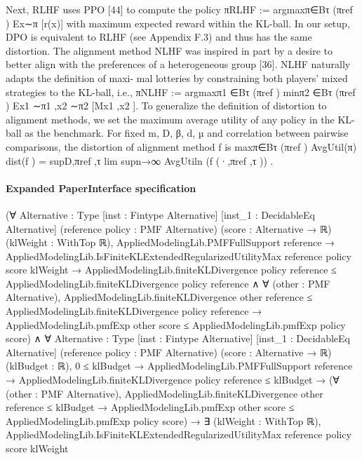 \documentclass[10pt]{article}
\begin{document}
\begin{ReviewVerbatim}
Next, RLHF uses PPO [44] to compute the policy πRLHF := argmaxπ∈Bτ (πref ) Ex∼π [r(x)] with
maximum expected reward within the KL-ball. In our setup, DPO is equivalent to RLHF (see
Appendix F.3) and thus has the same distortion.
The alignment method NLHF was inspired in part by a desire to better align with the
preferences of a heterogeneous group [36]. NLHF naturally adapts the definition of maxi-
mal lotteries by constraining both players’ mixed strategies to the KL-ball, i.e., πNLHF :=
argmaxπ1 ∈Bτ (πref ) minπ2 ∈Bτ (πref ) Ex1 ∼π1 ,x2 ∼π2 [Mx1 ,x2 ].
To generalize the definition of distortion to alignment methods, we set the maximum average utility of
any policy in the KL-ball as the benchmark. For fixed m, D, β, d, µ and correlation between pairwise
comparisons, the distortion of alignment method f is
                                                             maxπ∈Bτ (πref ) AvgUtil(π)
                      dist(f ) = supD,πref ,τ lim supn→∞       AvgUtiln (f (·,πref ,τ )) .
\end{ReviewVerbatim}



\paragraph{Expanded PaperInterface specification}
\begin{ReviewVerbatim}
(∀ {Alternative : Type} [inst : Fintype Alternative] [inst_1 : DecidableEq Alternative]
    (reference policy : PMF Alternative) (score : Alternative → ℝ) (klWeight : WithTop ℝ),
    AppliedModelingLib.PMFFullSupport reference →
      AppliedModelingLib.IsFiniteKLExtendedRegularizedUtilityMax reference policy score klWeight →
        AppliedModelingLib.finiteKLDivergence policy reference ≤
            AppliedModelingLib.finiteKLDivergence policy reference ∧
          ∀ (other : PMF Alternative),
            AppliedModelingLib.finiteKLDivergence other reference ≤
                AppliedModelingLib.finiteKLDivergence policy reference →
              AppliedModelingLib.pmfExp other score ≤ AppliedModelingLib.pmfExp policy score) ∧
  ∀ {Alternative : Type} [inst : Fintype Alternative] [inst_1 : DecidableEq Alternative]
    (reference policy : PMF Alternative) (score : Alternative → ℝ) (klBudget : ℝ),
    0 ≤ klBudget →
      AppliedModelingLib.PMFFullSupport reference →
        AppliedModelingLib.finiteKLDivergence policy reference ≤ klBudget →
          (∀ (other : PMF Alternative),
              AppliedModelingLib.finiteKLDivergence other reference ≤ klBudget →
                AppliedModelingLib.pmfExp other score ≤ AppliedModelingLib.pmfExp policy score) →
            ∃ (klWeight : WithTop ℝ),
              AppliedModelingLib.IsFiniteKLExtendedRegularizedUtilityMax reference policy score klWeight
\end{ReviewVerbatim}
\end{document}
